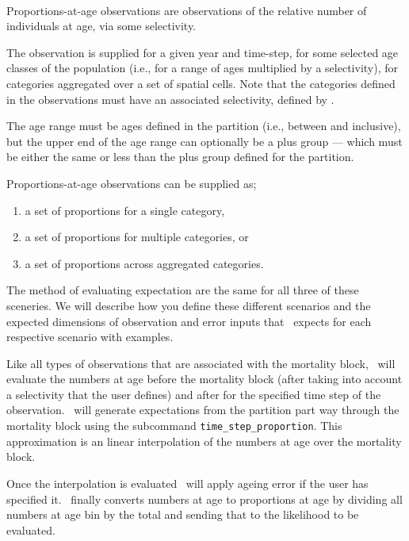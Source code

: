 \paragraph*{}
Proportions-at-age observations are observations of the relative number of individuals at age, via some selectivity. 

The observation is supplied for a given year and time-step, for some selected age classes of the population (i.e., for a range of ages multiplied by a selectivity), for categories aggregated over a set of spatial cells. Note that the categories defined in the observations must have an associated selectivity, defined by .

The age range must be ages defined in the partition (i.e., between  and  inclusive), but the upper end of the age range can optionally be a plus group --- which must be either the same or less than the plus group defined for the partition. 


Proportions-at-age observations can be supplied as; 
\begin{enumerate}
	\item a set of proportions for a single category, 
	\item a set of proportions for multiple categories, or
	\item a set of proportions across aggregated categories.
\end{enumerate}

The method of evaluating expectation are the same for all three of these sceneries. We will describe how you define these different scenarios and the expected dimensions of observation and error inputs that \CNAME\ expects for each respective scenario with examples.

Like all types of observations that are associated with the mortality block, \CNAME\ will evaluate the numbers at age before the mortality block (after taking into account a selectivity that the user defines) and after for the specified time step of the observation. \CNAME\ will generate expectations from the partition part way through the mortality block using the subcommand \texttt{time\_step\_proportion}. This approximation is an linear interpolation of the numbers at age over the mortality block. 

Once the interpolation is evaluated \CNAME\ will apply ageing error if the user has specified it. \CNAME\ finally converts numbers at age to proportions at age by dividing all numbers at age bin by the total and sending that to the likelihood to be evaluated.

